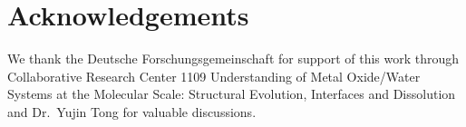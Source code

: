 \documentclass[twoside,twocolumn,9pt]{article}
\begin{document}

\section{Acknowledgements}
We thank the Deutsche Forschungsgemeinschaft for support of this work through Collaborative Research Center 1109 Understanding of Metal Oxide/Water Systems at the Molecular Scale: Structural Evolution, Interfaces and Dissolution and Dr.\ Yujin Tong for valuable discussions.




\end{document}
